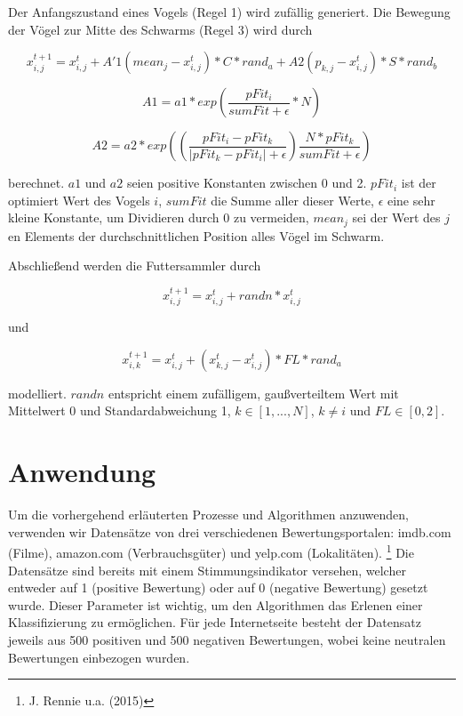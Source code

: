 \documentclass[a4paper,12pt]{article}
\begin{document}
Der Anfangszustand eines Vogels (Regel 1) wird zufällig generiert. Die Bewegung der Vögel zur Mitte des Schwarms (Regel 3) wird durch

\begin{equation}
x_{i,j}^{t+1}=x_{i,j}^t+A'1(mean_j-x_{i,j}^t)*C *rand_a+A2(p_{k,j}-x_{i,j}^t)*S*rand_b
\end{equation}

\begin{equation}
A1=a1*exp\left(\frac{pFit_i}{sumFit+\epsilon}*N\right)
\end{equation}

\begin{equation}
A2=a2*exp\left(\left(\frac{pFit_i-pFit_k}{|pFit_k-pFit_i|+\epsilon}\right)\frac{N*pFit_k}{sumFit+\epsilon}\right)
\end{equation}

berechnet. $a1$ und $a2$ seien positive Konstanten zwischen 0 und 2. $pFit_i$ ist der optimiert Wert des Vogels $i$, $sumFit$ die Summe aller dieser Werte, $\epsilon$ eine sehr kleine Konstante, um Dividieren durch 0 zu vermeiden, $mean_j$ sei der Wert des $j$en Elements der durchschnittlichen Position alles Vögel im Schwarm. 

Abschließend werden die Futtersammler durch 

\begin{equation}
x_{i,j}^{t+1}=x_{i,j}^t+randn*x_{i,j}^t
\end{equation}

und 

\begin{equation}
x_{i,k}^{t+1}=x_{i,j}^t+(x_{k,j}^t-x_{i,j}^t)*FL*rand_a
\end{equation}

modelliert. $randn$ entspricht einem zufälligem, gaußverteiltem Wert mit Mittelwert 0 und Standardabweichung 1, $k \in [1,...,N]$, $k\neq i$ und $FL \in [0,2]$.


\section{Anwendung}

Um die vorhergehend erläuterten Prozesse und Algorithmen anzuwenden, verwenden wir Datensätze von drei verschiedenen Bewertungsportalen: imdb.com (Filme), amazon.com (Verbrauchsgüter) und yelp.com (Lokalitäten). \footnote{J. Rennie u.a. (2015)} Die Datensätze sind bereits mit einem Stimmungsindikator versehen, welcher entweder auf 1 (positive Bewertung) oder auf 0 (negative Bewertung) gesetzt wurde. Dieser Parameter ist wichtig, um den Algorithmen das Erlenen einer Klassifizierung zu ermöglichen. Für jede Internetseite besteht der Datensatz jeweils aus 500 positiven und 500 negativen Bewertungen, wobei keine neutralen Bewertungen einbezogen wurden. 
\end{document}
